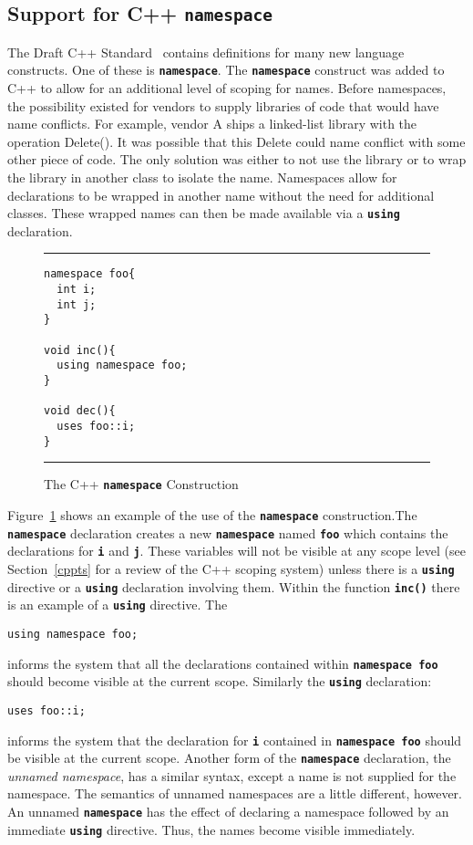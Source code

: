 \documentclass[12pt]{article} %
\newcommand{\reserved}[1]{\textbf{\texttt{#1}}} %
\newcommand{\UNSPACEFORBOX}{\vspace{-2ex}}
\newcommand{\HLINE}{\UNSPACEFORBOX%
\begin{flushleft}\rule{\textwidth}{0.01in}\end{flushleft}%
\UNSPACEFORBOX}
\newenvironment{BFIGURE}{

\begin{figure}
\small
\HLINE
}{
\HLINE
\normalsize
\end{figure}
}
\begin{document}
\subsection{Support for C++ \reserved{namespace}}
\label{namspcimp}
The Draft C++ Standard~\cite{C++Apr95} contains definitions for many
new language constructs. One of these is \reserved{namespace}. The
\reserved{namespace} construct was added to C++ to allow for 
an additional level of scoping for names. Before namespaces, the
possibility existed for vendors to supply libraries of code that would
have name conflicts. For example, vendor A ships a linked-list library
with the operation Delete(). It was possible that this Delete could
name conflict with some other piece of code. The only solution was either to
not use the library or to wrap the library in another class to 
isolate the name. Namespaces allow for declarations to be
wrapped in another name without the need for additional classes. These
wrapped names can then be made available via a \reserved{using}
declaration. 
\begin{BFIGURE}
\begin{verbatim}
namespace foo{
  int i;
  int j;
}

void inc(){
  using namespace foo;
}

void dec(){
  uses foo::i;
}
\end{verbatim}
\caption{The C++ \reserved{namespace} Construction}
\label{namespcex}
\end{BFIGURE}

Figure~\ref{namespcex} shows an example of the use of
the \reserved{namespace} construction.The \reserved{namespace} declaration creates a new \reserved{namespace} named
\reserved{foo} which contains the declarations for \reserved{i} and
\reserved{j}. These variables will not be visible at any scope level
(see Section~\ref{cppts} for a review of the C++ scoping system)
unless there is a \reserved{using} directive or a
\reserved{using} declaration involving them. Within the function
\reserved{inc()} there is an example of a \reserved{using}
directive. The 
\begin{verbatim} 
using namespace foo; 
\end{verbatim}
informs the system that all the declarations contained within
\reserved{namespace foo} should become visible at the current
scope. Similarly the \reserved{using} declaration: 
\begin{verbatim} 
uses foo::i;
\end{verbatim} 
informs the system that the declaration for \reserved{i} contained in
\reserved{namespace foo} should be visible at the current
scope. Another form of the \reserved{namespace} declaration, the
\emph{unnamed namespace}, has a similar syntax, except a name is not
supplied for the namespace. The semantics of unnamed namespaces
are a little different, however. An unnamed \reserved{namespace} has the effect
of declaring a namespace followed by an immediate \reserved{using}
directive. Thus, the names become visible immediately.
\end{document}
